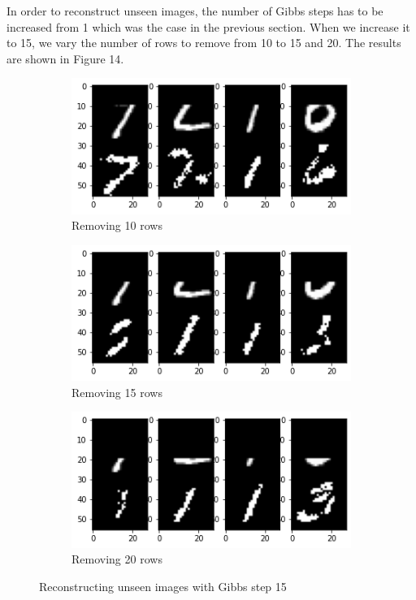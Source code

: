\documentclass[11pt,conference,compsoc]{IEEEtran}
\begin{document}
In order to reconstruct unseen images, the number of Gibbs steps has to be increased from 1 which was the case in the previous section. When we increase it to 15, we vary the number of rows to remove from 10 to 15 and 20. The results are shown in Figure 14.

\begin{figure}[h]
    \centering
    \begin{subfigure}[b]{0.32\textwidth}
    \includegraphics[width=\linewidth]{images/gibbs=15_remove=10.png}
    \caption{Removing 10 rows}
    \end{subfigure}
    \begin{subfigure}[b]{0.32\textwidth}
    \includegraphics[width=\linewidth]{images/gibbs=15_remove=15.png}
    \caption{Removing 15 rows}
    \end{subfigure}
    \begin{subfigure}[b]{0.32\textwidth}
    \includegraphics[width=\linewidth]{images/gibbs=15_remove=20.png}
    \caption{Removing 20 rows}
    \end{subfigure}
    \caption{Reconstructing unseen images with Gibbs step 15}
    \label{fig:14}
\end{figure}
\end{document}
